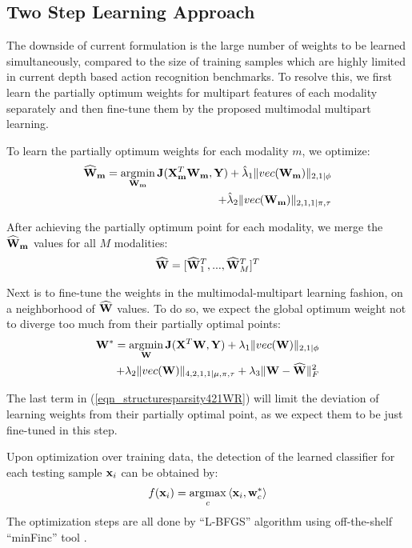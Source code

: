 \documentclass[9pt,technote,compsoc]{IEEEtran}
\begin{document}
\subsection{Two Step Learning Approach}
The downside of current formulation is the large number of weights to be learned simultaneously, compared to the size of training samples which are highly limited in current depth based action recognition benchmarks. To resolve this, we first learn the partially optimum weights for multipart features of each modality separately and then fine-tune them by the proposed multimodal multipart learning. 

To learn the partially optimum weights for each modality $m$, we optimize:
\begin{eqnarray}
\label{eqn_warmstartpoint}\widehat{\bf W}_{\bf m}=\mathop{\arg\!\min}_{\bf W_{\bf m}}{\bf J}({\bf X}_{\bf m}^T{\bf W}_{\bf m},{\bf Y})+\hat{\lambda}_1\|{vec(\bf W_{\bf m}})\|_{2,1|\phi}\nonumber\\
+\hat{\lambda}_2\|vec({\bf W}_{\bf m})\|_{2,1,1|\pi,\tau}
\end{eqnarray}

After achieving the partially optimum point for each modality, we merge the $\widehat{\bf W}_{\bf m}$ values for all $M$ modalities:
\begin{eqnarray}
\widehat{{\bf W}}=\lbrack\widehat{{\bf W}}_1^T,...,\widehat{{\bf W}}_M^T\rbrack^T
\end{eqnarray}

Next is to fine-tune the weights in the multimodal-multipart learning fashion, on a neighborhood of $\widehat{\bf W}$ values. To do so, we expect the global optimum weight not to diverge too much from their partially optimal points:
\begin{eqnarray}
\label{eqn_structuresparsity421WR}{\bf W}^*=\mathop{\arg\!\min}_{\bf W}{\bf J}({\bf X}^T{\bf W},{\bf Y})+\lambda_1\|{vec(\bf W})\|_{2,1|\phi}\nonumber\\
+\lambda_2\|vec({\bf W})\|_{4,2,1,1|\mu,\pi,\tau}+\lambda_3\|{\bf W}-{\widehat{\bf W}}\|_F^2
\end{eqnarray}

The last term in (\ref{eqn_structuresparsity421WR}) will limit the deviation of learning weights from their partially optimal point, as we expect them to be just fine-tuned in this step.

Upon optimization over training data, the detection of the learned classifier for each testing sample ${\bf x}_i$ can be obtained by:
\begin{eqnarray}
\label{eqn_detectiontest}f({\bf x}_i)=\mathop{\arg\!\max}_{c}{\langle{\bf x}_i,{\bf w}_c^*\rangle}
\end{eqnarray}
The optimization steps are all done by ``L-BFGS'' algorithm using off-the-shelf ``minFinc'' tool \cite{schmidt2005minfunc}.
\end{document}
